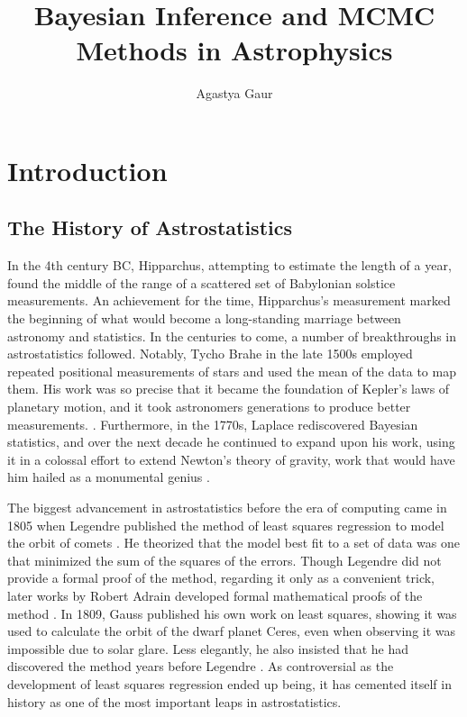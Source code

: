 \documentclass[preprint,longauthor]{aastex631}
\numberwithin{equation}{section}
\begin{document}
\label{placeholder} %

\title{Bayesian Inference and MCMC Methods in Astrophysics}
\author{Agastya Gaur}

\begin{abstract}
  \blindtext
\end{abstract}


\section{Introduction}
\label{sec:Introduction}
\subsection{The History of Astrostatistics}
In the 4th century BC, Hipparchus, attempting to estimate the length of a year, found the middle of the range of a scattered set of Babylonian solstice measurements. An achievement for the time, Hipparchus's measurement marked the beginning of what would become a long-standing marriage between astronomy and statistics. In the centuries to come, a number of breakthroughs in astrostatistics followed. Notably, Tycho Brahe in the late 1500s employed repeated positional measurements of stars and used the mean of the data to map them. His work was so precise that it became the foundation of Kepler's laws of planetary motion, and it took astronomers generations to produce better measurements. \citep{leavesleyTychoBrahesWay2018}. Furthermore, in the 1770s, Laplace rediscovered Bayesian statistics, and over the next decade he continued to expand upon his work, using it in a colossal effort to extend Newton's theory of gravity, work that would have him hailed as a monumental genius \citep{stiglerStudiesHistoryProbability1975}.

The biggest advancement in astrostatistics before the era of computing came in 1805 when Legendre published the method of least squares regression to model the orbit of comets \citep{feigelsonStatisticalChallengesModern2004}. He theorized that the model best fit to a set of data was one that minimized the sum of the squares of the errors. Though Legendre did not provide a formal proof of the method, regarding it only as a convenient trick, later works by Robert Adrain developed formal mathematical proofs of the method \citep{merrimanHistoryMethodLeast1877}. In 1809, Gauss published his own work on least squares, showing it was used to calculate the orbit of the dwarf planet Ceres, even when observing it was impossible due to solar glare. Less elegantly, he also insisted that he had discovered the method years before Legendre \citep{stiglerGaussInventionLeast1981}. As controversial as the development of least squares regression ended up being, it has cemented itself in history as one of the most important leaps in astrostatistics.
\end{document}
